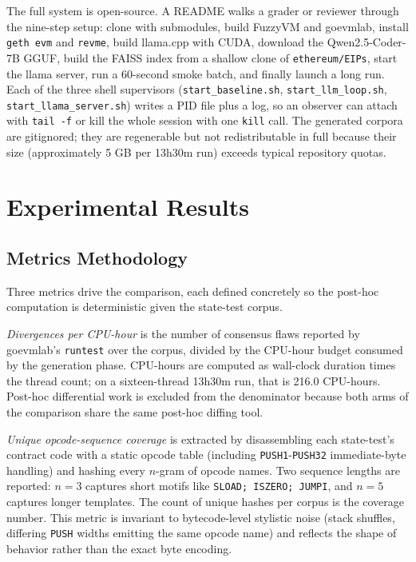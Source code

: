 \documentclass[conference]{IEEEtran}
\begin{document}
The full system is open-source. A README walks a grader or reviewer through the nine-step setup: clone with submodules, build FuzzyVM and goevmlab, install \texttt{geth evm} and \texttt{revme}, build llama.cpp with CUDA, download the Qwen2.5-Coder-7B GGUF, build the FAISS index from a shallow clone of \texttt{ethereum/EIPs}, start the llama server, run a 60-second smoke batch, and finally launch a long run. Each of the three shell supervisors (\texttt{start\_baseline.sh}, \texttt{start\_llm\_loop.sh}, \texttt{start\_llama\_server.sh}) writes a PID file plus a log, so an observer can attach with \texttt{tail -f} or kill the whole session with one \texttt{kill} call. The generated corpora are gitignored; they are regenerable but not redistributable in full because their size (approximately 5 GB per 13h30m run) exceeds typical repository quotas.

\section{Experimental Results}

\subsection{Metrics Methodology}

Three metrics drive the comparison, each defined concretely so the post-hoc computation is deterministic given the state-test corpus.

\emph{Divergences per CPU-hour} is the number of consensus flaws reported by goevmlab's \texttt{runtest} over the corpus, divided by the CPU-hour budget consumed by the generation phase. CPU-hours are computed as wall-clock duration times the thread count; on a sixteen-thread 13h30m run, that is 216.0 CPU-hours. Post-hoc differential work is excluded from the denominator because both arms of the comparison share the same post-hoc diffing tool.

\emph{Unique opcode-sequence coverage} is extracted by disassembling each state-test's contract code with a static opcode table (including \texttt{PUSH1}-\texttt{PUSH32} immediate-byte handling) and hashing every $n$-gram of opcode names. Two sequence lengths are reported: $n=3$ captures short motifs like \texttt{SLOAD; ISZERO; JUMPI}, and $n=5$ captures longer templates. The count of unique hashes per corpus is the coverage number. This metric is invariant to bytecode-level stylistic noise (stack shuffles, differing \texttt{PUSH} widths emitting the same opcode name) and reflects the shape of behavior rather than the exact byte encoding.
\end{document}

